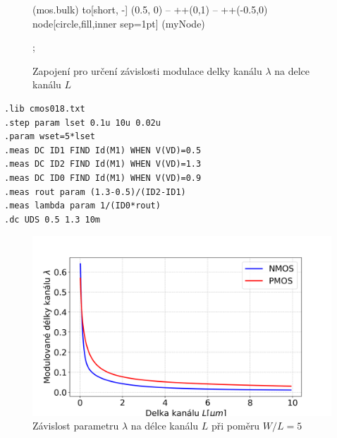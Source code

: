 \begin{figure}[H]
\begin{minipage}{0.5\textwidth}
\begin{circuitikz}[scale=1, transform shape]
              (mos.bulk) to[short, -] (0.5, 0) -- ++(0,1) -- ++(-0.5,0)  node[circle,fill,inner sep=1pt] (myNode) {}

            ;
        \end{circuitikz}

        \vspace{5mm} 
    \end{minipage}
    \caption{\label{cod:cod_NP_WL_const} Zapojení pro určení závislosti modulace delky kanálu \(\lambda\) na delce kanálu \(L\)}
\end{figure}

\begin{lstlisting}[language=Spice, caption={ \centering Kod simulace použítí pro získání závislosti \\ modulované délky kanálu \(\lambda\) na délce kanálu \(L\)}, label={cod:cod_lambda}]
.lib cmos018.txt
.step param lset 0.1u 10u 0.02u
.param wset=5*lset
.meas DC ID1 FIND Id(M1) WHEN V(VD)=0.5
.meas DC ID2 FIND Id(M1) WHEN V(VD)=1.3
.meas DC ID0 FIND Id(M1) WHEN V(VD)=0.9
.meas rout param (1.3-0.5)/(ID2-ID1)
.meas lambda param 1/(ID0*rout)
.dc UDS 0.5 1.3 10m
\end{lstlisting}

\vspace{-7mm}
\begin{figure}[h]
    \centering
    \includegraphics[height=0.28\textheight]{text/img/lambda.png}
    \caption{\label{fig:lambda} Závislost parametru \(\lambda\) na délce kanálu \(L\) při poměru \(W/L = 5\)}
\end{figure}

\vspace{-1mm}


